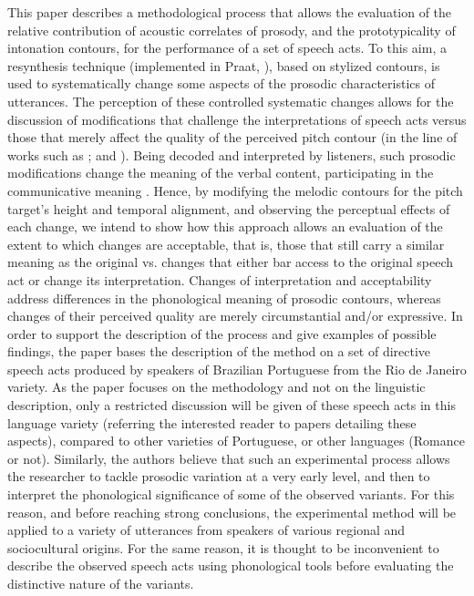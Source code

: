 \documentclass[output=paper]{LSP/langsci}
\begin{document}
This paper describes a methodological process that allows the evaluation of the relative contribution of acoustic correlates of prosody, and the prototypicality of intonation contours, for the performance of a set of speech acts. 
To this aim, a resynthesis technique (implemented in Praat, \citealt{Boersma.praat}), based on stylized contours, is used to systematically change some aspects of the prosodic characteristics of utterances. 
The perception of these controlled systematic changes allows for the discussion of modifications that challenge the interpretations of speech acts versus those that merely affect the quality of the perceived pitch contour (in the line of works such as  \citealt{Uldall1960,fonagy1972}; and \citealt{house2005phrase}). 
Being decoded and interpreted by listeners, such prosodic modifications change the meaning of the verbal content, participating in the communicative meaning \citep{Mahadin2011,nadeu2011pitch,portes2014dialogical,gonzalez2015gestural}. 
Hence, by modifying the melodic contours for the pitch target's height and temporal alignment, and observing the perceptual effects of each change, we intend to show how this approach allows an evaluation of the extent to which changes are acceptable, that is, those that still carry a similar meaning as the original vs. changes that either bar access to the original speech act or change its interpretation. 
Changes of interpretation and acceptability address differences in the phonological meaning of prosodic contours, whereas changes of their perceived quality are merely circumstantial and/or expressive.
In order to support the description of the process and give examples of possible findings, the paper bases the description of the method on a set of directive speech acts produced by speakers of Brazilian Portuguese from the Rio de Janeiro variety.
As the paper focuses on the methodology and not on the linguistic description, only a restricted discussion will be given of these speech acts in this language variety (referring the interested reader to papers detailing these aspects), compared to other varieties of Portuguese, or other languages (Romance or not).
Similarly, the authors believe that such an experimental process allows the researcher to tackle prosodic variation at a very early level, and then to interpret the phonological significance of some of the observed variants.
For this reason, and before reaching strong conclusions, the experimental method will be applied to a variety of utterances from speakers of various regional and sociocultural origins.
For the same reason, it is thought to be inconvenient to describe the observed speech acts using phonological tools before evaluating the distinctive nature of the variants.
\end{document}
